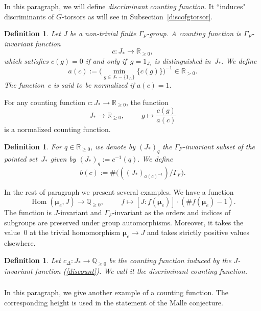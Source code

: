 \documentclass[a4paper,english,12pt]{amsart}
\newcommand{\QQ}{\mathbb{Q}}
\newcommand{\RR}{\mathbb{R}}
\newcommand{\muu}{\boldsymbol{\mu}}
\DeclareMathOperator{\ord}{ord}
\DeclareMathOperator{\Hom}{Hom}
\newtheorem{mydef}[equation]{Definition}
\numberwithin{equation}{subsection}
\begin{document}
\subsubsection{}In this paragraph, we will define {\it discriminant counting function}. It ``induces" discriminants of $G$-torsors as will see in Subsection~\ref{discofgtorsor}.
\begin{mydef}
Let $J$ be a non-trivial finite $\Gamma_F$-group. A counting function is $\Gamma_F$-invariant function $$c:J_*\to\RR_{\geq 0},$$ which satisfies $c(g)=0$ if and only if~$g=1_{J_*}$ is distinguished in~$J_*.$ We define $$a(c):=\big(\min_{g\in J_*-\{1_{J_*}\}}\{c(g)\}\big)^{-1}\in\RR_{>0}.$$ The function~$c$ is said to be normalized if $a(c)=1.$
\end{mydef}
For any counting function $c:J_*\to\RR_{\geq 0}$, the function %
$$J_*\to\RR_{\geq 0},\hspace{1cm} g\mapsto \frac{c(g)}{a(c)}$$ is a normalized counting function.
\begin{mydef}
For $q\in\RR_{\geq 0}$, we denote by $(J_*)_q$ the $\Gamma_F$-invariant subset of the pointed set~$J_*$ given by $(J_*)_q:=c^{-1}(q).$ We define $$b(c):=\#  \big(((J_*)_{a(c)^{-1}})/\Gamma_F\big).$$
\end{mydef}
In the rest of paragraph we present several examples. %
 We have a function 
\begin{equation}
\Hom(\muu_e,J)\to\QQ_{\geq 0},\hspace{1cm} f\mapsto [J:f(\muu_e)]\cdot (\# f(\muu_e)-1).
\label{discount}\tag{*}
\end{equation}The function is $J$-invariant and $\Gamma_F$-invariant as the orders and indices of subgroups are preserved under group automorphisms. Moreover, it takes the value~$0$ at the trivial homomorphism $\muu_e\to J$ and takes strictly positive values elsewhere.
\begin{mydef}
Let $c_{\Delta}:J_*\to\QQ_{\geq 0}$ be the counting function induced by the $J$-invariant function (\ref{discount}). We call it the discriminant counting function.
\end{mydef}
\subsubsection{} In this paragraph, we give another example of a counting function. The corresponding height is used in the statement of the Malle conjecture.
\end{document}
